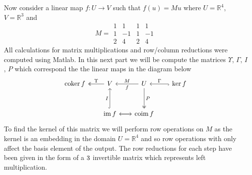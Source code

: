 \documentclass[12pt]{amsart}
\theoremstyle{definition}
\newcommand{\R}{\mathbb{R}}
\DeclareMathOperator{\kernel}{\mathrm{ker}}
\DeclareMathOperator{\coker}{\mathrm{coker}}
\DeclareMathOperator{\image}{\mathrm{im}}
\DeclareMathOperator{\coim}{\mathrm{coim}}
\newcommand{\ra}{\rightarrow}
\begin{document}
\begin{enumerate}
    Now consider a linear map $f:U\ra V$ such that $f(u)=Mu$ where  $U=\R^4$, $V=\R^3$ and $$M=
 \boxed{\begin{matrix}
1 & 1 & 1 & 1\\
1 & -1 & 1 & -1 \\
2 & 4 & 2 & 4
\end{matrix}}$$ 
All calculations for matrix multiplications and row/column reductions were computed using Matlab. In this next part we will be compute the matrices $\Upsilon$, $\Gamma$, $I$, $P$ which correspond the the linear maps in the diagram below
\[\begin{tikzcd}[row sep=1cm, column sep=.65cm]
     \coker f &\arrow[l, twoheadrightarrow, "\Upsilon"']V& U\arrow[d, twoheadrightarrow, "P"]\arrow[l, "M"', "f"] & \kernel f\arrow[l, "\Gamma"', hook]\\
     &\image f\arrow[u, hook, "I"]\arrow[r]& \coim f\arrow[l]
    \end{tikzcd}\]
To find the kernel of this matrix we will perform row operations on $M$ as the kernel is an embedding in the domain $U=\R^4$ and so row operations with only affect the basis element of the output. The row reductions for each step have been given in the form of a $3\time 3$ invertible matrix which represents left multiplication. 


\end{enumerate}
\end{document}
